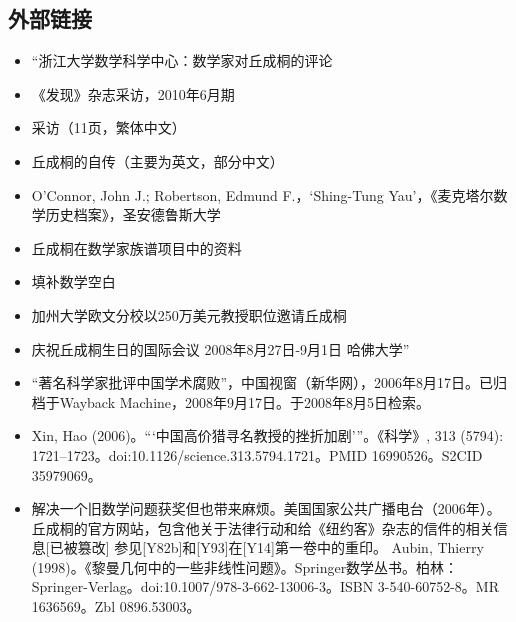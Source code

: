 \subsection{外部链接}
\begin{itemize}
\item “浙江大学数学科学中心：数学家对丘成桐的评论  
\item 《发现》杂志采访，2010年6月期  
\item 采访（11页，繁体中文）  
\item 丘成桐的自传（主要为英文，部分中文）  
\item O'Connor, John J.; Robertson, Edmund F.，‘Shing-Tung Yau’，《麦克塔尔数学历史档案》，圣安德鲁斯大学  
\item 丘成桐在数学家族谱项目中的资料  
\item 填补数学空白  
\item 加州大学欧文分校以250万美元教授职位邀请丘成桐  
\item 庆祝丘成桐生日的国际会议 2008年8月27日-9月1日 哈佛大学”

\item “著名科学家批评中国学术腐败”，中国视窗（新华网），2006年8月17日。已归档于Wayback Machine，2008年9月17日。于2008年8月5日检索。  
\item Xin, Hao (2006)。“‘中国高价猎寻名教授的挫折加剧’”。《科学》, 313 (5794): 1721–1723。doi:10.1126/science.313.5794.1721。PMID 16990526。S2CID 35979069。  
\item 解决一个旧数学问题获奖但也带来麻烦。美国国家公共广播电台（2006年）。  
丘成桐的官方网站，包含他关于法律行动和给《纽约客》杂志的信件的相关信息[已被篡改]  
参见[Y82b]和[Y93]在[Y14]第一卷中的重印。  
Aubin, Thierry (1998)。《黎曼几何中的一些非线性问题》。Springer数学丛书。柏林：Springer-Verlag。doi:10.1007/978-3-662-13006-3。ISBN 3-540-60752-8。MR 1636569。Zbl 0896.53003。
\end{itemize}